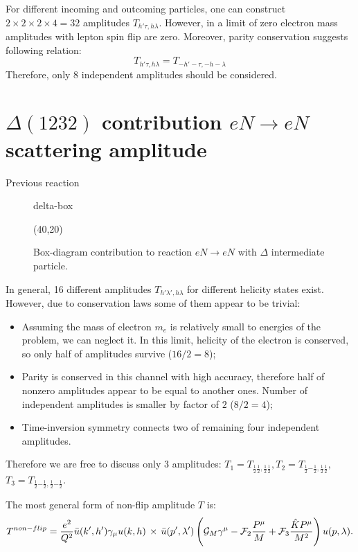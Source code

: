 \documentclass{article}
\newcommand{\hp}{{\frac{1}{2}}}
\newcommand{\hm}{{-\frac{1}{2}}}
\newcommand{\cG}{{\cal G}}
\newcommand{\cF}{{\cal F}}
\begin{document}
	For different incoming and outcoming particles, one can construct
	$2 \times 2 \times 2 \times 4 = 32$ amplitudes $T_{h' \tau, h \lambda}$.
	However, in a limit of zero electron mass amplitudes with lepton 
	spin flip are zero. Moreover, parity conservation suggests following
	relation:
	\begin{equation}
		T_{h' \tau, h \lambda} = T_{-h' -\tau, -h -\lambda}
	\end{equation}
	Therefore, only $8$ independent amplitudes should be considered.
	
\section{$\Delta(1232)$ contribution $e N \to e N$ scattering amplitude}
	Previous reaction
	\begin{figure} \centering
	\begin{fmffile}{delta-box}
		\begin{fmfgraph*}(40,20)
		\end{fmfgraph*}
	\end{fmffile}
	\caption{Box-diagram contribution to reaction $eN \to eN$ with %
		$\Delta$ intermediate particle.}
	\end{figure}
	
	In general, 16 different amplitudes $T_{h'\lambda',h\lambda}$ 
	for different helicity states exist. However, due to conservation 
	laws some of them appear to be trivial:
	\begin{itemize}
		\item Assuming the mass of electron $m_e$ is relatively small 
			to energies of the problem, we can neglect it. In this 
			limit, helicity of the electron is conserved, so only half 
			of amplitudes survive ($16/2 = 8$);
		\item Parity is conserved in this channel with high accuracy, 
			therefore half of nonzero amplitudes appear to be equal 
			to another ones. Number of independent amplitudes is 
			smaller by factor of $2$ ($8/2 = 4$);
		\item Time-inversion symmetry connects two of remaining four 
			independent amplitudes.			
	\end{itemize}
	Therefore we are free to discuss only $3$ amplitudes: 
	$T_{1} = T_{\hp \hp, \hp \hp}, T_{2} = T_{\hp \hm, \hp \hp},$
	$T_{3} = T_{\hp \hm, \hp \hm}$.
	
	The most general form of non-flip amplitude $T$ is:
	\begin{equation} \label{str_amp} 
		T^{non-flip} = \frac{e^2}{Q^2} \bar{u}(k',h') \gamma_\mu u(k,h) 
		\, \times \, \bar{u}(p',\lambda') 
		\left(\cG_M  \gamma^\mu - \cF_2 
		\frac{P^{\mu}}{M} + \cF_3  \frac{\hat{K} P^{\mu}}{M^2} 
		\right) u(p,\lambda).
	\end{equation}
	
\end{document}
